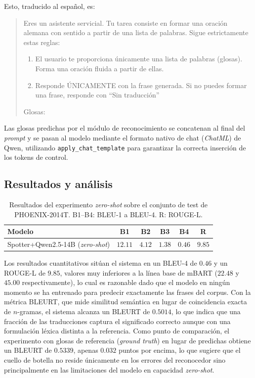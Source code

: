 Esto, traducido al español, es:
\begin{quote}
\ttfamily\small
Eres un asistente servicial. Tu tarea consiste en formar una oración alemana con sentido a partir de una lista de palabras. Sigue estrictamente estas reglas:
\begin{enumerate}
	 \item El usuario te proporciona únicamente una lista de palabras (glosas).
	Forma una oración fluida a partir de ellas.
	\item Responde ÚNICAMENTE con la frase generada.
	Si no puedes formar una frase, responde con ``Sin traducción''
\end{enumerate}
Glosas:
\end{quote}

Las glosas predichas por el módulo de reconocimiento se concatenan al final del \textit{prompt} y se pasan al modelo mediante el formato nativo de chat (\textit{ChatML}) de Qwen, utilizando \texttt{apply\_chat\_template} para garantizar la correcta inserción de los tokens de control.

\subsection{Resultados y análisis}

\begin{table}[H]
	\centering
	\begin{tabular}{lccccc}
		\hline
		\textbf{Modelo} & \textbf{B1} & \textbf{B2} & \textbf{B3} & \textbf{B4} & \textbf{R} \\ \hline
		Spotter+Qwen2.5-14B (\textit{zero-shot}) & $12.11$ & $4.12$ & $1.38$ & $0.46$ & $9.85$ \\ \hline
	\end{tabular}
	\caption{Resultados del experimento \textit{zero-shot} sobre el conjunto de test de PHOENIX-2014T\@. B1--B4: BLEU-1 a BLEU-4. R: ROUGE-L\@.}
	\label{tab:zeroshot_results}
\end{table}

Los resultados cuantitativos sitúan el sistema en un BLEU-4 de $0.46$ y un ROUGE-L de $9.85$, valores muy inferiores a la línea base de mBART ($22.48$ y $45.00$ respectivamente), lo cual es razonable dado que el modelo en ningún momento se ha entrenado para predecir exactamente las frases del corpus.
Con la métrica BLEURT, que mide similitud semántica en lugar de coincidencia exacta de $n$-gramas, el sistema alcanza un BLEURT de $0.5014$, lo que indica que una fracción de las traducciones captura el significado correcto aunque con una formulación léxica distinta a la referencia.
Como punto de comparación, el experimento con glosas de referencia (\textit{ground truth}) en lugar de predichas obtiene un BLEURT de $0.5339$, apenas $0.032$ puntos por encima, lo que sugiere que el cuello de botella no reside únicamente en los errores del reconocedor sino principalmente en las limitaciones del modelo en capacidad \textit{zero-shot}.

